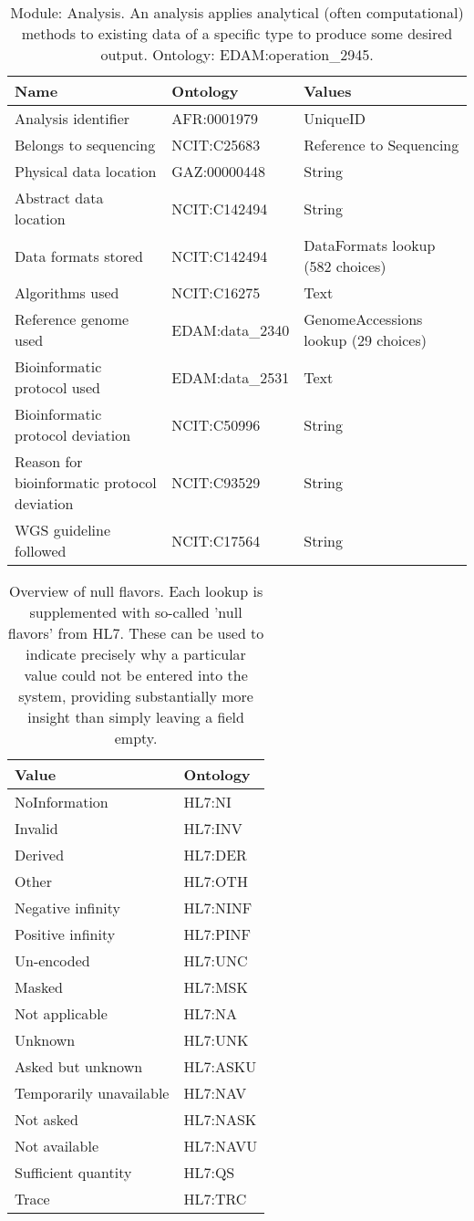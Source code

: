\documentclass{article}
\begin{document}
\begin{table}[htb]
\begin{tabular}{lll}
Name & Ontology & Values \\
\hline
Analysis identifier & AFR:0001979 & UniqueID \\
Belongs to sequencing & NCIT:C25683 & Reference to Sequencing \\
Physical data location & GAZ:00000448 & String \\
Abstract data location & NCIT:C142494 & String \\
Data formats stored & NCIT:C142494 & DataFormats lookup (582 choices) \\
Algorithms used & NCIT:C16275 & Text \\
Reference genome used & EDAM:data\_2340 & GenomeAccessions lookup (29 choices) \\
Bioinformatic protocol used & EDAM:data\_2531 & Text \\
Bioinformatic protocol deviation & NCIT:C50996 & String \\
Reason for bioinformatic protocol deviation & NCIT:C93529 & String \\
WGS guideline followed & NCIT:C17564 & String \\
\hline
\end{tabular}
\caption[Module: Analysis]{\label{table:table10} Module: Analysis. An analysis applies analytical (often computational) methods to existing data of a specific type to produce some desired output. Ontology: EDAM:operation\_2945. }
\end{table}

\begin{table}[htb]
\begin{tabular}{ll}
Value & Ontology \\
\hline
NoInformation & HL7:NI \\
Invalid & HL7:INV \\
Derived & HL7:DER \\
Other & HL7:OTH \\
Negative infinity & HL7:NINF \\
Positive infinity & HL7:PINF \\
Un-encoded & HL7:UNC \\
Masked & HL7:MSK \\
Not applicable & HL7:NA \\
Unknown & HL7:UNK \\
Asked but unknown & HL7:ASKU \\
Temporarily unavailable & HL7:NAV \\
Not asked & HL7:NASK \\
Not available & HL7:NAVU \\
Sufficient quantity & HL7:QS \\
Trace & HL7:TRC \\
\hline
\end{tabular}
\caption[NullFlavors]{\label{table:table11} Overview of null flavors. Each lookup is supplemented with so-called 'null flavors' from HL7. These can be used to indicate precisely why a particular value could not be entered into the system, providing substantially more insight than simply leaving a field empty. }
\end{table}
\end{document}
